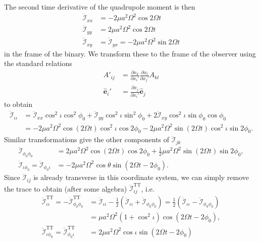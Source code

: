 The second time derivative of the quadrupole moment is then
\begin{align}
\ddot{\mathcal{I}}_{xx} &= - 2\mu a^2 \Omega^2 \cos 2\Omega t \\
\ddot{\mathcal{I}}_{yy} &= 2\mu a^2 \Omega^2 \cos 2\Omega t \\
\ddot{\mathcal{I}}_{xy} &=
\ddot{\mathcal{I}}_{yx} = - 2\mu a^2 \Omega^2 \sin 2\Omega t
\end{align}
in the frame of the binary. We transform these to the frame of the observer
using the standard relations
\begin{align}
A'_{ij} &= 
\frac{\partial x_k}{\partial x_i'}
\frac{\partial x_l}{\partial x_j'} A_{kl} \\
\hat{\boldsymbol{e}}_{i}' &= 
\frac{\partial x_j}{\partial x_i'}\hat{\boldsymbol{e}}_{j}
\end{align}
to obtain
\begin{equation}
\begin{split}
\ddot{\mathcal{I}}_{\iota\iota} &= 
\ddot{\mathcal{I}}_{xx} \cos^2 \iota \cos^2 \phi_0 
+  \ddot{\mathcal{I}}_{yy} \cos^2 \iota \sin^2 \phi_0 
+ 2  \ddot{\mathcal{I}}_{xy} \cos^2\iota\sin\phi_0\cos\phi_0 \\
&= - 2\mu a^2 \Omega^2 \cos(2\Omega t) \cos^2\iota \cos 2\phi_0
-2 \mu a^2 \Omega^2 \sin(2\Omega t) \cos^2\iota \sin 2\phi_0.
\end{split}
\end{equation}
Similar transformations give the other components of $\ddot{\mathcal{I}}_{jk}$
\begin{align}
\ddot{\mathcal{I}}_{\phi_0\phi_0} &=
2\mu a^2 \Omega^2 \cos(2\Omega t) \cos 2\phi_0
+ \frac{1}{2} \mu a^2 \Omega^2 \sin(2\Omega t) \sin 2\phi_0, \\
\ddot{\mathcal{I}}_{\iota\phi_0} = 
\ddot{\mathcal{I}}_{\phi_0\iota} &= 
- 2 \mu a^2 \Omega^2 \cos\theta \sin\left(2\Omega t - 2\phi_0\right).
\end{align}
Since $\ddot{\mathcal{I}}_{ij}$ is already transverse in this coordinate
system, we can simply remove the trace to obtain (after some algebra)
$\ddot{\mathcal{I}}_{ij}^\mathrm{TT}$, i.e.
\begin{equation}
\begin{split}
\ddot{\mathcal{I}}_{\iota\iota}^\mathrm{TT} = - \ddot{\mathcal{I}}_{\phi_0\phi_0}^\mathrm{TT} &= 
\ddot{\mathcal{I}}_{\iota\iota} - \frac{1}{2}
\left( \ddot{\mathcal{I}}_{\iota\iota} + 
\ddot{\mathcal{I}}_{\phi_0\phi_0} \right) = 
\frac{1}{2} \left(  \ddot{\mathcal{I}}_{\iota\iota} - 
\ddot{\mathcal{I}}_{\phi_0\phi_0}
\right) \\
&= \mu a^2\Omega^2 \left(1 + \cos^2\iota\right) \cos\left(2\Omega t - 2\phi_0\right) ,\\
\ddot{\mathcal{I}}_{\iota\phi_0}^\mathrm{TT} = \ddot{\mathcal{I}}_{\phi_0\iota}^\mathrm{TT}  &=
2\mu a^2 \Omega^2 \cos\iota \sin(2\Omega t - 2\phi_0)
\end{split}
\end{equation}
